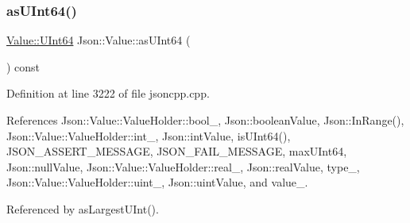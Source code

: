 \mbox{\label{class_json_1_1_value_a0e44a5a4cd0c099f9570dfa25813eb60}} 
\subsubsection{\texorpdfstring{as\+U\+Int64()}{asUInt64()}}
{\footnotesize\ttfamily \hyperlink{class_json_1_1_value_a8b62564be8c087c6d18de180ff4e13e3}{Value\+::\+U\+Int64} Json\+::\+Value\+::as\+U\+Int64 (\begin{DoxyParamCaption}{ }\end{DoxyParamCaption}) const}



Definition at line 3222 of file jsoncpp.\+cpp.



References Json\+::\+Value\+::\+Value\+Holder\+::bool\+\_\+, Json\+::boolean\+Value, Json\+::\+In\+Range(), Json\+::\+Value\+::\+Value\+Holder\+::int\+\_\+, Json\+::int\+Value, is\+U\+Int64(), J\+S\+O\+N\+\_\+\+A\+S\+S\+E\+R\+T\+\_\+\+M\+E\+S\+S\+A\+GE, J\+S\+O\+N\+\_\+\+F\+A\+I\+L\+\_\+\+M\+E\+S\+S\+A\+GE, max\+U\+Int64, Json\+::null\+Value, Json\+::\+Value\+::\+Value\+Holder\+::real\+\_\+, Json\+::real\+Value, type\+\_\+, Json\+::\+Value\+::\+Value\+Holder\+::uint\+\_\+, Json\+::uint\+Value, and value\+\_\+.



Referenced by as\+Largest\+U\+Int().


